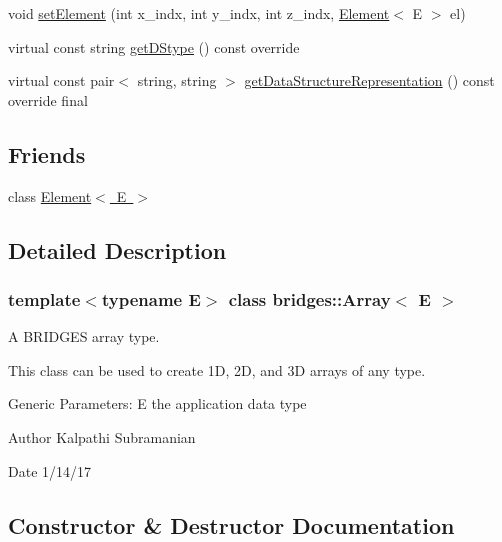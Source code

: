 \begin{DoxyCompactItemize}
\item 
void \mbox{\hyperlink{classbridges_1_1_array_a526c3a190b48a338541e5b4667c5eedf}{set\+Element}} (int x\+\_\+indx, int y\+\_\+indx, int z\+\_\+indx, \mbox{\hyperlink{classbridges_1_1_element}{Element}}$<$ E $>$ el)
\item 
virtual const string \mbox{\hyperlink{classbridges_1_1_array_ab93f7379870a7c0bc63490c53d95ba09}{get\+D\+Stype}} () const override
\item 
virtual const pair$<$ string, string $>$ \mbox{\hyperlink{classbridges_1_1_array_ab039fc0b5dd5683bbdf0fe71fce9d317}{get\+Data\+Structure\+Representation}} () const override final
\end{DoxyCompactItemize}
\subsection*{Friends}
\begin{DoxyCompactItemize}
\item 
class \mbox{\hyperlink{classbridges_1_1_array_a8c6ff2a8dd3e27346dd25f588a78828a}{Element$<$ E $>$}}
\end{DoxyCompactItemize}


\subsection{Detailed Description}
\subsubsection*{template$<$typename E$>$\newline
class bridges\+::\+Array$<$ E $>$}

A B\+R\+I\+D\+G\+ES array type. 

This class can be used to create 1D, 2D, and 3D arrays of any type.

Generic Parameters\+: E the application data type

\begin{DoxyAuthor}{Author}
Kalpathi Subramanian 
\end{DoxyAuthor}
\begin{DoxyDate}{Date}
1/14/17 
\end{DoxyDate}


\subsection{Constructor \& Destructor Documentation}
\mbox{\label{classbridges_1_1_array_a958421b86ff55303b5fc7d505109f9fe}} 
